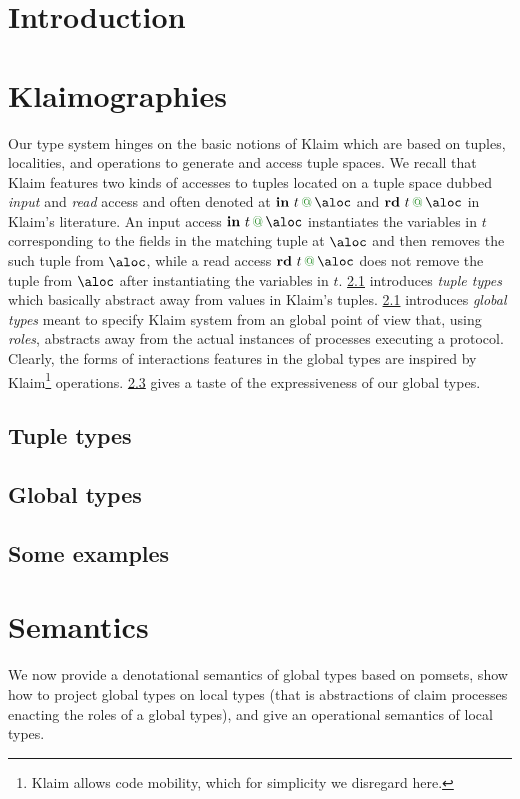 \documentclass[runningheads,a4paper]{llncs}
\begin{document}
\section{Introduction}
\label{sec:intro}


\section{Klaimographies}
\label{sec:klaimographies}
Our type system hinges on the basic notions of Klaim which are based
on tuples, localities, and operations to generate and access tuple
spaces.
%
We recall that Klaim features two kinds of accesses to tuples located
on a tuple space dubbed \emph{input} and \emph{read} access and often
denoted at $\textbf{in}\ t \at \aloc$ and
$\textbf{rd}\ t \at \aloc$ in Klaim's literature.
%
An input access $\textbf{in}\ t \at \aloc$ instantiates the
variables in $t$ corresponding to the fields in the matching
tuple at $\aloc$ and then removes the such tuple from $\aloc$, while
a read access $\textbf{rd}\ t \at \aloc$ does not remove the
tuple from $\aloc$ after instantiating the variables in $t$.
%
\cref{sec:tuples} introduces \emph{tuple types} which basically
abstract away from values in Klaim's tuples.
%
\cref{sec:tuples} introduces \emph{global types} meant to specify
Klaim system from an global point of view that, using \emph{roles},
abstracts away from the actual instances of processes executing a
protocol.
%
Clearly, the forms of interactions features in the global types are
inspired by Klaim\footnote{Klaim allows code mobility, which for
  simplicity we disregard here.} operations.
%
\cref{sec:examples} gives a taste of the expressiveness of our global
types.
\subsection{Tuple types}
\label{sec:tuples}

\subsection{Global types}
\label{sec:gt}

\subsection{Some examples}
\label{sec:examples}

%

\section{Semantics}
We now provide a denotational semantics of global types based on
pomsets, show how to project global types on local types (that is
abstractions of claim processes enacting the roles of a global types),
and give an operational semantics of local types.
\end{document}
